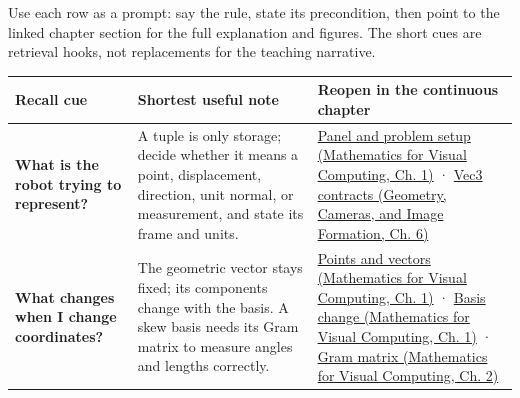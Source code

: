 Use each row as a prompt: say the rule, state its precondition, then point to the linked chapter section for the full explanation and figures. The short cues are retrieval hooks, not replacements for the teaching narrative.

{\def\LTcaptype{none} %
\begin{longtable}[]{@{}
  >{\raggedright\arraybackslash}p{}
  >{\raggedright\arraybackslash}p{}
  >{\raggedright\arraybackslash}p{}@{}}
\toprule\noalign{}
\begin{minipage}[b]{\linewidth}\raggedright
Recall cue
\end{minipage} & \begin{minipage}[b]{\linewidth}\raggedright
Shortest useful note
\end{minipage} & \begin{minipage}[b]{\linewidth}\raggedright
Reopen in the continuous chapter
\end{minipage} \\
\midrule\noalign{}
\endhead
\bottomrule\noalign{}
\endlastfoot
\textbf{What is the robot trying to represent?} & A tuple is only storage; decide whether it means a point, displacement, direction, unit normal, or measurement, and state its frame and units. & \href{../02-Mathematics-for-Visual-Computing/main.pdf\#nameddest=01-foundations-i-ch017-the-panel-gives-us-a-reason-to-learn}{Panel and problem setup (Mathematics for Visual Computing, Ch. 1)} · \href{../03-Geometry-Cameras-and-Image-Formation/main.pdf\#nameddest=02-foundations-ii-ch037-three-stored-numbers-are-not-the-complete-contract}{Vec3 contracts (Geometry, Cameras, and Image Formation, Ch. 6)} \\
\textbf{What changes when I change coordinates?} & The geometric vector stays fixed; its components change with the basis. A skew basis needs its Gram matrix to measure angles and lengths correctly. & \href{../02-Mathematics-for-Visual-Computing/main.pdf\#nameddest=01-foundations-i-ch017-an-arrow-is-not-the-address-written-beside-it}{Points and vectors (Mathematics for Visual Computing, Ch. 1)} · \href{../02-Mathematics-for-Visual-Computing/main.pdf\#nameddest=01-foundations-i-ch017-a-basis-is-a-measuring-arrangement-not-the-vector-itself}{Basis change (Mathematics for Visual Computing, Ch. 1)} · \href{../02-Mathematics-for-Visual-Computing/main.pdf\#nameddest=01-foundations-i-ch018-a-gram-matrix-remembers-the-geometry-of-a-slanted-basis}{Gram matrix (Mathematics for Visual Computing, Ch. 2)} \\

\end{longtable}}
